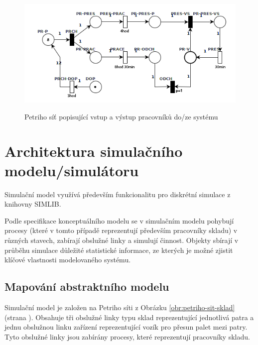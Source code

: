 \documentclass[11pt]{article}
\begin{document}
	\begin{figure}[h!]
		\caption{Petriho síť popisující vstup a výstup pracovníků do/ze systému}
		\centering
		\includegraphics[width=\textwidth]{images/petri_net_prichody.png}
		\label{obr:petriho-sit-vstupvystup}
	\end{figure}
	
	
%	
	
	\newpage
	\section{Architektura simulačního modelu/simulátoru}
	Simulační model využívá především funkcionalitu pro diskrétní simulace\cite[str.~119]{ims-prezentace} z knihovny SIMLIB\cite{simlib}.
	
	Podle specifikace konceptuálního modelu se v simulačním modelu pohybují procesy\cite[str.~121]{ims-prezentace} (které v tomto případě reprezentují především pracovníky skladu) v různých stavech, zabírají obslužné linky\cite[str.~146]{ims-prezentace} a simulují činnost.
	Objekty sbírají v průběhu simulace důležité statistické informace, ze kterých je možné zjistit klíčové vlastnosti modelovaného systému.
	
	\subsection{Mapování abstraktního modelu}
	Simulační model je založen na Petriho síti z Obrázku \ref{obr:petriho-sit-sklad} (strana \pageref{obr:petriho-sit-sklad}). Obsahuje tři obslužné linky typu sklad\cite[str.~146]{ims-prezentace} reprezentující jednotlivá patra a jednu obslužnou linku zařízení\cite[str.~146]{ims-prezentace} reprezentující vozík pro přesun palet mezi patry. Tyto obslužné linky jsou zabírány procesy, které reprezentují pracovníky skladu.
	
\end{document}
